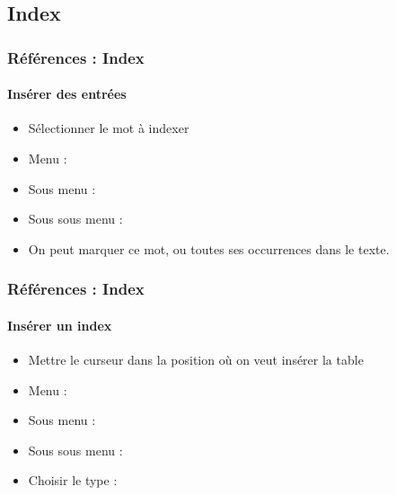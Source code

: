 \documentclass[xcolor=table]{beamer}
\begin{document}
\subsection{Index}

\begin{frame}[t]
\frametitle{Références : Index}
\framesubtitle{Insérer des entrées}

\begin{minipage}{0.69\textwidth}
	\begin{itemize}
		\item Sélectionner le mot à indexer 
		\item Menu : 
		\item Sous menu : 
		\item Sous sous menu : 
		\item On peut marquer ce mot, ou toutes ses occurrences dans le texte.
	\end{itemize}
\end{minipage}
\begin{minipage}{0.30\textwidth}
	
\end{minipage}

\end{frame}

\begin{frame}[t]
\frametitle{Références : Index}
\framesubtitle{Insérer un index}

\begin{itemize}
	\item Mettre le curseur dans la position où on veut insérer la table
	\item Menu : 
	\item Sous menu : 
\end{itemize}
\begin{minipage}{0.39\textwidth}
	\begin{itemize}
		\item Sous sous menu : 
		\item Choisir le type :  
	\end{itemize}
\end{minipage}
\begin{minipage}{0.60\textwidth}
\end{minipage}

\end{frame}
\end{document}
